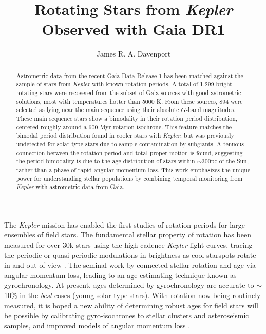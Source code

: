 \documentclass[manuscript, letterpaper]{aastex6}
\makeatletter
\let\origsection\section
\renewcommand\section{\@ifstar{\starsection}{\nostarsection}}
\newcommand\nostarsection[1]{\sectionprelude\origsection{#1}}
\newcommand\starsection[1]{\sectionprelude\origsection*{#1}}
\newcommand\sectionprelude{\vspace{1em}}
\newcommand{\Kepler}{\textsl{Kepler}\xspace}
\makeatother
\begin{document}
\title{Rotating Stars from \Kepler Observed with Gaia DR1}


\author{
	James R. A. Davenport
	}

 

 

\begin{abstract}
Astrometric data from the recent Gaia Data Release 1 has been matched against the sample of stars from \Kepler with known rotation periods. A total of 1,299 bright rotating stars were recovered from the subset of Gaia sources with good astrometric solutions, most with temperatures hotter than 5000 K. From these sources, 894 were selected as lying near the main sequence using their absolute $G$-band magnitudes. These main sequence stars show a bimodality in their rotation period distribution, centered roughly around a 600 Myr rotation-isochrone. This feature matches the bimodal period distribution found in cooler stars with \Kepler, but was previously undetected for solar-type stars due to sample contamination by subgiants.
A tenuous connection between the rotation period and total proper motion is found, suggesting the period bimodality is due to the age distribution of stars within $\sim$300pc of the Sun, rather than a phase of rapid angular momentum loss.
This work emphasizes the unique power for understanding stellar populations by combining temporal monitoring from \Kepler with astrometric data from Gaia.
\end{abstract}



\section{Introduction}

The \Kepler mission \citep{borucki2010} has enabled the first studies of rotation periods for large ensembles of field stars. The fundamental stellar property of rotation has been measured for over 30k stars using the high cadence \Kepler light curves, tracing the periodic or quasi-periodic modulations in brightness as cool starspots rotate in and out of view \citep{reinhold2013,mcquillan2014}. The seminal work by \citet{skumanich1972} connected stellar rotation and age via angular momentum loss, leading to an age estimating technique known as gyrochronology. At present, ages determined by gyrochronology are accurate to $\sim$10\% in the {\it best} cases (young solar-type stars). With rotation now being routinely measured, it is hoped a new ability of determining robust ages for field stars will be possible by calibrating gyro-isochrones to stellar clusters and asteroseismic samples, and improved models of angular momentum loss \citep[e.g.][]{angus2015,van-saders2016}. 
\end{document}
